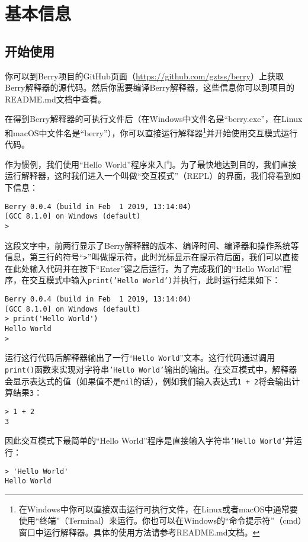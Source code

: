 \chapter{基本信息}

\section{开始使用}

你可以到Berry项目的GitHub页面（\url{https://github.com/gztss/berry}）上获取Berry解释器的源代码。然后你需要编译Berry解释器，这些信息你可以到项目的README.md文档中查看。

在得到Berry解释器的可执行文件后（在Windows中文件名是``berry.exe''，在Linux和macOS中文件名是``berry''），你可以直接运行解释器\footnote{在Windows中你可以直接双击运行可执行文件，在Linux或者macOS中通常要使用``终端''（Terminal）来运行。你也可以在Windows的``命令提示符''（cmd）窗口中运行解释器。具体的使用方法请参考README.md文档。}并开始使用交互模式运行代码。

作为惯例，我们使用``Hello World''程序来入门。为了最快地达到目的，我们直接运行解释器，这时我们进入一个叫做``交互模式''（REPL）的界面，我们将看到如下信息：
\begin{lstlisting}[language=berry, numbers=none]
Berry 0.0.4 (build in Feb  1 2019, 13:14:04)
[GCC 8.1.0] on Windows (default)
>
\end{lstlisting}

这段文字中，前两行显示了Berry解释器的版本、编译时间、编译器和操作系统等信息，第三行的符号``\texttt{>}''叫做提示符，此时光标显示在提示符后面，我们可以直接在此处输入代码并在按下``Enter''键之后运行。为了完成我们的``Hello World''程序，在交互模式中输入\texttt{print('Hello World')}并执行，此时运行结果如下：
\begin{lstlisting}[language=berry, numbers=none]
Berry 0.0.4 (build in Feb  1 2019, 13:14:04)
[GCC 8.1.0] on Windows (default)
> print('Hello World')
Hello World
>
\end{lstlisting}

运行这行代码后解释器输出了一行``\texttt{Hello World}''文本。这行代码通过调用\texttt{print()}函数来实现对字符串\texttt{'Hello World'}输出的输出。在交互模式中，解释器会显示表达式的值（如果值不是\texttt{nil}的话），例如我们输入表达式\texttt{1 + 2}将会输出计算结果\texttt{3}：
\begin{lstlisting}[language=berry, numbers=none]
> 1 + 2
3
\end{lstlisting}
因此交互模式下最简单的``Hello World''程序是直接输入字符串\texttt{'Hello World'}并运行：
\begin{lstlisting}[language=berry, numbers=none]
> 'Hello World'
Hello World
\end{lstlisting}


